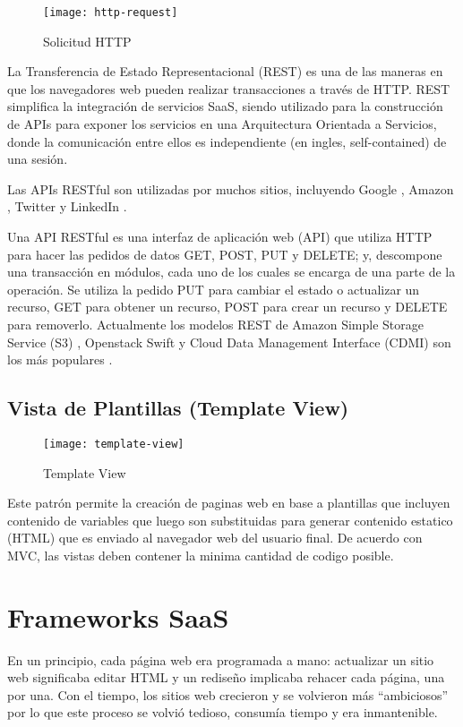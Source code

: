 \begin{figure}[H]
        \centering
        \texttt{[image: http-request]}
        \caption{Solicitud HTTP \protect\cite{Fox2013-ct}}
        \label{fig:http-request}
\end{figure}

La Transferencia de Estado Representacional (REST) es una de las maneras en que los navegadores web pueden realizar transacciones a través de HTTP. REST simplifica la integración de servicios SaaS, siendo utilizado para la construcción de APIs para exponer los servicios en una Arquitectura Orientada a Servicios, donde la comunicación entre ellos es independiente (en ingles, self-contained) de una sesión.

Las APIs RESTful son utilizadas por muchos sitios, incluyendo Google 
\cite{Google-Inc2016-lm}, Amazon \cite{Aws2016-iu}, Twitter \cite{Twitter2016-df} y LinkedIn \cite{LinkedIn2016-am}.

Una API RESTful es una interfaz de aplicación web (API) que utiliza HTTP para hacer las pedidos de datos GET, POST, PUT y DELETE; y, descompone una transacción en módulos, cada uno de los cuales se encarga de una parte de la operación. Se utiliza la pedido PUT para cambiar el estado o actualizar un recurso, GET para obtener un recurso, POST para crear un recurso y DELETE para removerlo. Actualmente los modelos REST de Amazon Simple Storage Service (S3) \cite{Aws2016-tc}, Openstack Swift \cite{OpenStack2016-ht} y Cloud Data Management Interface (CDMI) \cite{Snia2016-vq} son los más populares \cite{Richardson2008-ng}.

\subsection{Vista de Plantillas (Template View)}

\begin{figure}[H]
        \centering
        \texttt{[image: template-view]}
        \caption{Template View \protect\cite{Fowler2012-az}}
        \label{fig:template-view}
    \end{figure}

Este patrón permite la creación de paginas web en base a plantillas que incluyen contenido de variables que luego son substituidas para generar contenido estatico (HTML) que es enviado al navegador web del usuario final. 
De acuerdo con MVC, las vistas deben contener la minima cantidad de codigo posible.

\section{Frameworks SaaS}
En un principio, cada página web era programada a mano: actualizar un sitio web significaba editar HTML y un rediseño implicaba rehacer cada página, una por una. Con el tiempo, los sitios web crecieron y se volvieron más “ambiciosos” por lo que este proceso se volvió tedioso, consumía tiempo y era inmantenible.

